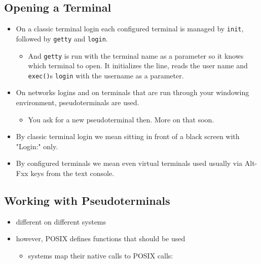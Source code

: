 \subsection{Opening a Terminal}

\begin{itemize}
\item On a classic terminal login each configured terminal is managed by
\texttt{init}, followed by \texttt{getty} and \texttt{login}.
	\begin{itemize}
	\item And \texttt{getty} is run with the terminal name as a parameter so
	it knows which terminal to open. It initializes the line, reads the user
	name and \texttt{exec()}s \texttt{login} with the username as a
	parameter.
	\end{itemize}

\item On networks logins and on terminals that are run through your windowing
environment, pseudoterminals are used.
	\begin{itemize}
	\item You ask for a new pseudoterminal then. More on that soon.
	\end{itemize}

\end{itemize}

\begin{itemize}
\item By classic terminal login we mean sitting in front of a black screen with
"Login:" only.
\item By configured terminals we mean even virtual terminals used usually via
Alt-Fxx keys from the text console.
\end{itemize}

\subsection{Working with Pseudoterminals}

\begin{itemize}
\item different on different systems
\item however, POSIX defines functions that should be used
	\begin{itemize}
	\item systems map their native calls to POSIX calls:
	\end{itemize}
\end{itemize}

